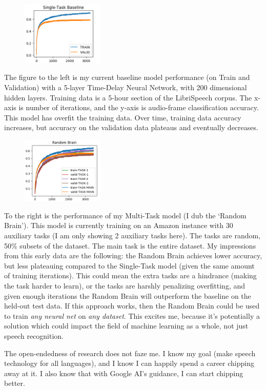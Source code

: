 \documentclass[12pt,a4paper]{article}
\begin{document}
\begin{figure}
\centering
\includegraphics[width=0.35\textwidth]{figs/stl.png}
\end{figure}

The figure to the left is my current baseline model performance (on Train and Validation) with a 5-layer Time-Delay Neural Network, with 200 dimensional hidden layers. Training data is a 5-hour section of the LibriSpeech corpus. The x-axis is number of iterations, and the y-axis is audio-frame classification accuracy. This model has overfit the training data. Over time, training data accuracy increases, but accuracy on the validation data plateaus and eventually decreases. 


\begin{figure}
  \centering
  \includegraphics[width=0.35\textwidth]{figs/mtl.png}
\end{figure}

To the right is the performance of my Multi-Task model (I dub the `Random Brain'). This model is currently training on an Amazon instance with 30 auxiliary tasks (I am only showing 2 auxiliary tasks here). The tasks are random, 50\% subsets of the dataset. The main task is the entire dataset. My impressions from this early data are the following: the Random Brain achieves lower accuracy, but less plateauing compared to the Single-Task model (given the same amount of training iterations). This could mean the extra tasks are a hindrance (making the task harder to learn), or the tasks are harshly penalizing overfitting, and given enough iterations the Random Brain will outperform the baseline on the held-out test data. If this approach works, then the Random Brain could be used to train \textit{any neural net} on \textit{any dataset}. This excites me, because it's potentially a solution which could impact the field of machine learning as a whole, not just speech recognition.


The open-endedness of research does not faze me. I know my goal (make speech technology for all languages), and I know I can happily spend a career chipping away at it. I also know that with Google AI's guidance, I can start chipping better.
\end{document}

